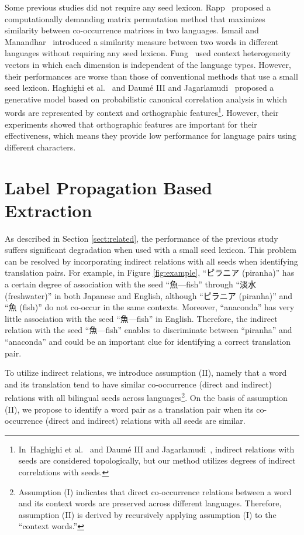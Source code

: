 \documentclass[english]{jnlp_1.4}
\begin{document}
Some previous studies did not require any seed lexicon. 
Rapp~\citeyear{rapp95} proposed a computationally demanding matrix permutation method that maximizes similarity between co-occurrence matrices in two languages. 
Ismail and Manandhar~\citeyear{ismail10} introduced a similarity measure between two words in different languages without requiring any seed lexicon. 
Fung~\citeyear{fung95} used context heterogeneity vectors in which each dimension is independent of the language types. 
However, their performances are worse than those of conventional methods that use a small seed lexicon. 
Haghighi et al.~\citeyear{haghighi08} and Daum{\'e} III and Jagarlamudi~\citeyear{hal11} proposed a generative model based on probabilistic canonical correlation analysis in which words are represented by context and orthographic features\footnote{In~Haghighi et al.~\citeyear{haghighi08} and Daum{\'e} III and Jagarlamudi~\citeyear{hal11}, indirect relations with seeds are considered topologically, but our method utilizes degrees of indirect correlations with seeds.}. 
However, their experiments showed that orthographic features are important for their effectiveness, which means they provide low performance for language pairs using different characters. 


\section{Label Propagation Based Extraction}
\label{sect:proposed}

As described in Section \ref{sect:related}, the performance of the previous study suffers significant degradation when used with a small seed lexicon. 
This problem can be resolved by incorporating indirect relations with all seeds when identifying translation pairs. 
For example, in Figure \ref{fig:example}, ``ピラニア (piranha)'' has a certain degree of association with the seed ``魚---fish'' through ``淡水 (freshwater)'' in both Japanese and English, although ``ピラニア (piranha)'' and ``魚 (fish)'' do not co-occur in the same contexts. 
Moreover, ``anaconda'' has very little association with the seed ``魚---fish'' in English. 
Therefore, the indirect relation with the seed ``魚---fish'' enables to discriminate between ``piranha'' and ``anaconda'' and could be an important clue for identifying a correct translation pair. 

To utilize indirect relations, we introduce assumption (II), namely that a word and its translation tend to have similar co-occurrence (direct and indirect) relations with all bilingual seeds across languages\footnote{Assumption (I) indicates that direct co-occurrence relations between a word and its context words are preserved across different languages. Therefore, assumption (II) is derived by recursively applying assumption (I) to the ``context words.''}. 
On the basis of assumption (II), we propose to identify a word pair as a translation pair when its co-occurrence (direct and indirect) relations with all seeds are similar. 
\end{document}
